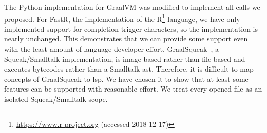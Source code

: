 \documentclass[sigplan,10pt,screen]{acmart}
\begin{document}
The Python implementation for
GraalVM was modified to implement all \api calls we proposed. For
FastR, the
implementation of the R\footnote{\url{https://www.r-project.org} (accessed
  2018-12-17)} language, we have only implemented support for completion trigger
characters, so the implementation is nearly unchanged. This demonstrates that we
can provide some support even with the least amount of language developer
effort. GraalSqueak~\cite{niephaus2018graalsqueak}, a Squeak/Smalltalk
\cite{ingalls1997back} implementation, is image-based rather than file-based and
executes bytecodes rather than a Smalltalk \ac{ast}. Therefore, it is difficult
to map concepts of GraalSqueak to \ac{lsp}. We have chosen it to show that at
least some features can be supported with reasonable effort. We treat every
opened  file as an isolated Squeak/Smalltalk scope.
\end{document}
